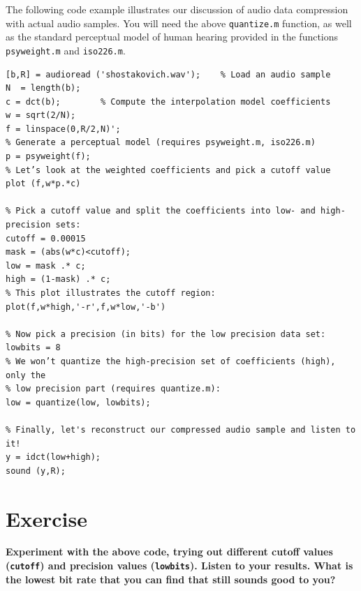 \documentclass[10pt]{article}
\begin{document}
The following code example illustrates our discussion of audio data compression
with actual audio samples. You will need the above {\tt quantize.m} function,
as well as the standard perceptual model of human hearing provided in the
functions {\tt psyweight.m} and {\tt iso226.m}. 
\begin{verbatim}
[b,R] = audioread ('shostakovich.wav');    % Load an audio sample
N  = length(b);
c = dct(b);        % Compute the interpolation model coefficients
w = sqrt(2/N);
f = linspace(0,R/2,N)';
% Generate a perceptual model (requires psyweight.m, iso226.m)
p = psyweight(f);
% Let’s look at the weighted coefficients and pick a cutoff value
plot (f,w*p.*c)

% Pick a cutoff value and split the coefficients into low- and high-precision sets:
cutoff = 0.00015
mask = (abs(w*c)<cutoff);
low = mask .* c;
high = (1-mask) .* c;
% This plot illustrates the cutoff region:
plot(f,w*high,'-r',f,w*low,'-b')

% Now pick a precision (in bits) for the low precision data set:
lowbits = 8
% We won’t quantize the high-precision set of coefficients (high), only the
% low precision part (requires quantize.m): 
low = quantize(low, lowbits);

% Finally, let's reconstruct our compressed audio sample and listen to it!
y = idct(low+high);
sound (y,R);
\end{verbatim}
\section*{Exercise}
{\bf Experiment with the above code, trying out different cutoff values (\verb+cutoff+)
and precision values (\verb+lowbits+). Listen to your results. What is the 
lowest bit rate that you can find that still sounds good to you?}
\end{document}
